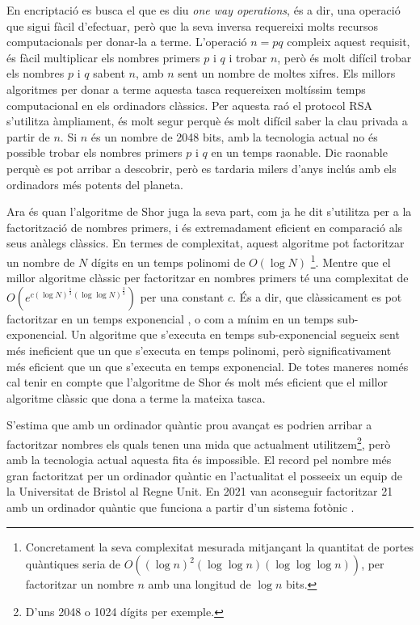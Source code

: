 En encriptació es busca el que es diu \textit{one way operations}, és a dir, una operació que sigui fàcil d'efectuar, però que la seva inversa requereixi molts recursos computacionals per donar-la a terme. L'operació $n = pq$ compleix aquest requisit, és fàcil multiplicar els nombres primers $p$ i $q$ i trobar $n$, però és molt difícil trobar els nombres $p$ i $q$ sabent $n$, amb $n$ sent un nombre de moltes xifres. Els millors algoritmes per donar a terme aquesta tasca requereixen moltíssim temps computacional en els ordinadors clàssics. Per aquesta raó el protocol RSA s'utilitza àmpliament, és molt segur perquè és molt difícil saber la clau privada a partir de $n$. Si $n$ és un nombre de 2048 bits, amb la tecnologia actual no és possible trobar els nombres primers $p$ i $q$ en un temps raonable. Dic raonable perquè es pot arribar a descobrir, però es tardaria milers d'anys inclús amb els ordinadors més potents del planeta.

Ara és quan l'algoritme de Shor juga la seva part, com ja he dit s'utilitza per a la factorització de nombres primers, i és extremadament eficient en comparació als seus anàlegs clàssics. En termes de complexitat, aquest algoritme pot factoritzar un nombre de $N$ dígits en un temps polinomi de $O(\log N)$ \footnote{Concretament la seva complexitat mesurada mitjançant la quantitat de portes quàntiques seria de $O((\log n)^2 (\log \log n) (\log \log \log n))$, per factoritzar un nombre $n$ amb una longitud de $\log n$ bits.}. Mentre que el millor algoritme clàssic per factoritzar en nombres primers té una complexitat de $O(e^{c(\log N)^\frac{1}{3} (\log \log N)^\frac{2}{3}})$ per una constant $c$. És a dir, que clàssicament es pot factoritzar en un temps exponencial \cite{Shor_97}, o com a mínim en un temps sub-exponencial. Un algoritme que s'executa en temps sub-exponencial segueix sent més ineficient que un que s'executa en temps polinomi, però significativament més eficient que un que s'executa en temps exponencial. De totes maneres només cal tenir en compte que l'algoritme de Shor és molt més eficient que el millor algoritme clàssic que dona a terme la mateixa tasca.

S'estima que amb un ordinador quàntic prou avançat es podrien arribar a factoritzar nombres els quals tenen una mida que actualment utilitzem\footnote{D'uns 2048 o 1024 dígits per exemple.}, però amb la tecnologia actual aquesta fita és impossible. El record pel nombre més gran factoritzat per un ordinador quàntic en l'actualitat el posseeix un equip de la Universitat de Bristol al Regne Unit. En 2021 van aconseguir factoritzar 21 amb un ordinador quàntic que funciona a partir d'un sistema fotònic \cite{21_factor}.

